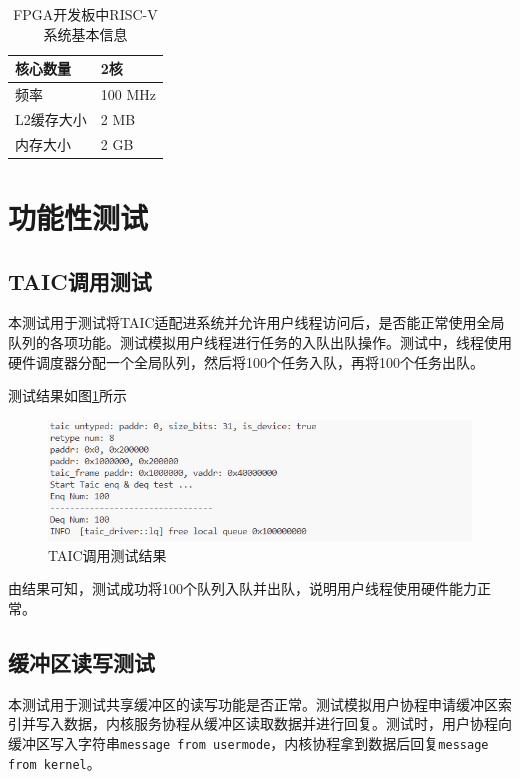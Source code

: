 \begin{table}[!h]
\centering
\caption{FPGA开发板中RISC-V系统基本信息}\label{tab:fpga-info}
\renewcommand{\arraystretch}{1.2}
\begin{tabular}{|l|l|}
\hline
核心数量 & 2核 \\
\hline
频率 & 100 MHz \\
\hline
L2缓存大小 & 2 MB \\
\hline
内存大小 & 2 GB \\
\hline
\end{tabular}
\end{table}

\section{功能性测试}

\subsection{TAIC调用测试}

本测试用于测试将TAIC适配进系统并允许用户线程访问后，是否能正常使用全局队列的各项功能。测试模拟用户线程进行任务的入队出队操作。测试中，线程使用硬件调度器分配一个全局队列，然后将100个任务入队，再将100个任务出队。


测试结果如图\ref{taictest}所示

\begin{figure}[htbp]
  \centering
  \includegraphics[width=\textwidth]{images/taic_test2.png}
  \caption{TAIC调用测试结果}\label{taictest}
\end{figure}

由结果可知，测试成功将100个队列入队并出队，说明用户线程使用硬件能力正常。

\subsection{缓冲区读写测试}

本测试用于测试共享缓冲区的读写功能是否正常。测试模拟用户协程申请缓冲区索引并写入数据，内核服务协程从缓冲区读取数据并进行回复。测试时，用户协程向缓冲区写入字符串\texttt{message from usermode}，内核协程拿到数据后回复\texttt{message from kernel}。

